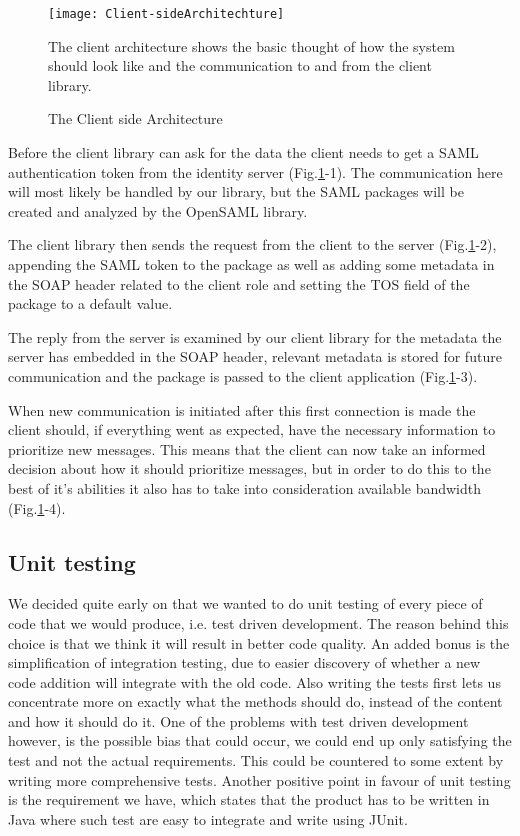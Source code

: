         \begin{figure}[htb]
            \centering
            \texttt{[image: Client-sideArchitechture]}
            \caption{The Client side Architecture}
            The client architecture shows the basic thought of how the system should look like and the communication to and from the client library. 
            \label{fig:Client-sideArchitechture}
        \end{figure}
 
        Before the client library can ask for the data the client needs to get a SAML authentication token from the identity server (Fig.\ref{fig:Client-sideArchitechture}-1). The communication here will most likely be handled by our library, but the SAML packages will be created and analyzed by the OpenSAML library. 

        The client library then sends the request from the client to the server (Fig.\ref{fig:Client-sideArchitechture}-2), appending the SAML token to the package as well as adding some metadata in the SOAP header related to the client role and setting the TOS field of the package to a default value.

        The reply from the server is examined by our client library for the metadata the server has embedded in the SOAP header, relevant metadata is stored for future communication and the package is passed to the client application (Fig.\ref{fig:Client-sideArchitechture}-3).

        When new communication is initiated after this first connection is made the client should, if everything went as expected, have the necessary information to prioritize new messages. This means that the client can now take an informed decision about how it should prioritize messages, but in order to do this to the best of it's abilities it also has to take into consideration available bandwidth (Fig.\ref{fig:Client-sideArchitechture}-4).
    
    \subsection{Unit testing}\label{Unit testing}
    We decided quite early on that we wanted to do unit testing of every piece of code that we would produce, i.e. test driven development. The reason behind this choice is that we think it will result in better code quality. An added bonus is the simplification of integration testing, due to easier discovery of whether a new code addition will integrate with the old code. Also writing the tests first lets us concentrate more on exactly what the methods should do, instead of the content and how it should do it. One of the problems with test driven development however, is the possible bias that could occur, we could end up only satisfying the test and not the actual requirements. This could be countered to some extent by writing more comprehensive tests. Another positive point in favour of unit testing is the requirement we have, which states that the product has to be written in Java where such test are easy to integrate and write using JUnit.

